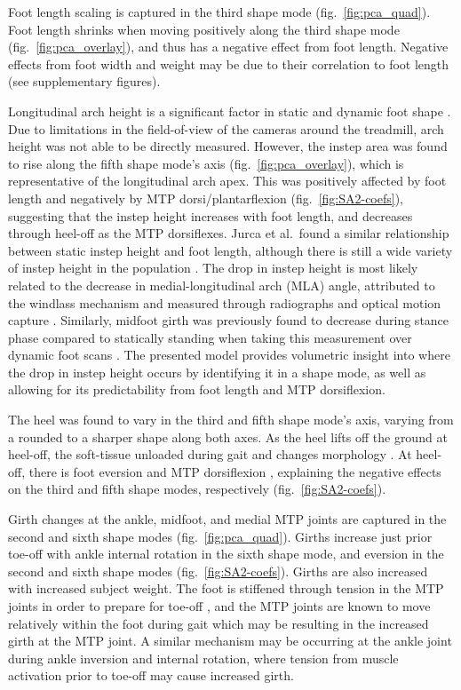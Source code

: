 \documentclass[defaultstyle,11pt]{comps}
\begin{document}
Foot length scaling is captured in the third shape mode (fig.~\ref{fig:pca_quad}).
Foot length shrinks when moving positively along the third shape mode (fig.~\ref{fig:pca_overlay}), and thus has a negative effect from foot length.
Negative effects from foot width and weight may be due to their correlation to foot length (see supplementary figures).

Longitudinal arch height is a significant factor in static \citep{Stankovic2020, Conrad2019} and dynamic foot shape \citep{Schuster2021} .
Due to limitations in the field-of-view of the cameras around the treadmill, arch height was not able to be directly measured.
However, the instep area was found to rise along the fifth shape mode's axis (fig.~\ref{fig:pca_overlay}), which is representative of the longitudinal arch apex.
This was positively affected by foot length and negatively by MTP dorsi/plantarflexion (fig.~\ref{fig:SA2-coefs}), suggesting that the instep height increases with foot length, and decreases through heel-off as the MTP dorsiflexes.
Jurca et al.~found a similar relationship between static instep height and foot length, although there is still a wide variety of instep height in the population \citep{Jurca2019}.
The drop in instep height is most likely related to the decrease in medial-longitudinal arch (MLA) angle, attributed to the windlass mechanism and measured through radiographs and optical motion capture \citep{Hicks1954, Caravaggi2010, Stolwijk2014}.
Similarly, midfoot girth was previously found to decrease during stance phase compared to statically standing when taking this measurement over dynamic foot scans \citep{Grau2018}.
The presented model provides volumetric insight into where the drop in instep height occurs by identifying it in a shape mode, as well as allowing for its predictability from foot length and MTP dorsiflexion.

The heel was found to vary in the third and fifth shape mode's axis, varying from a rounded to a sharper shape along both axes.
As the heel lifts off the ground at heel-off, the soft-tissue unloaded during gait and changes morphology \citep{Fontanella2013}.
At heel-off, there is foot eversion and MTP dorsiflexion \citep{Leardini2007}, explaining the negative effects on the third and fifth shape modes, respectively (fig.~\ref{fig:SA2-coefs}).

Girth changes at the ankle, midfoot, and medial MTP joints are captured in the second and sixth shape modes (fig.~\ref{fig:pca_quad}).
Girths increase just prior toe-off with ankle internal rotation in the sixth shape mode, and eversion in the second and sixth shape modes (fig.~\ref{fig:SA2-coefs}).
Girths are also increased with increased subject weight.
The foot is stiffened through tension in the MTP joints in order to prepare for toe-off \citep{Hicks1954}, and the MTP joints are known to move relatively within the foot during gait \citep{Wolf2008, Lundgren2008} which may be resulting in the increased girth at the MTP joint.
A similar mechanism may be occurring at the ankle joint during ankle inversion and internal rotation, where tension from muscle activation prior to toe-off may cause increased girth.
\end{document}
